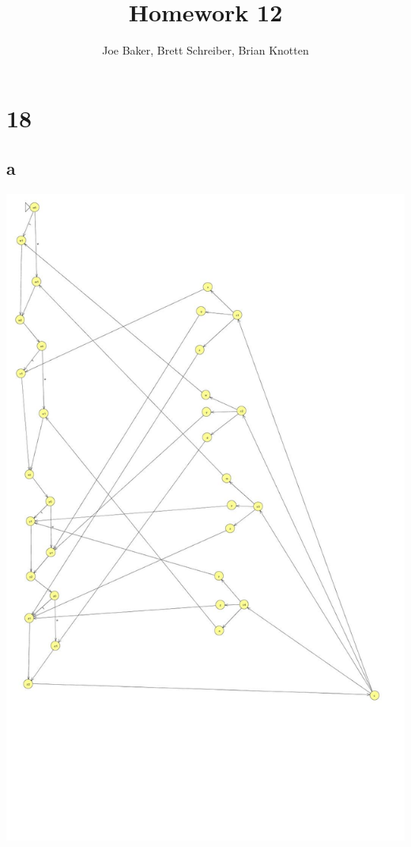 \documentclass[letterpaper,notitlepage,twoside]{article}
\begin{document}
\title{Homework 12}
\author{Joe Baker, Brett Schreiber, Brian Knotten}
\maketitle

\section*{18}
\subsection*{a}
\includegraphics[scale = 0.5] {sorted}
\end{document}
